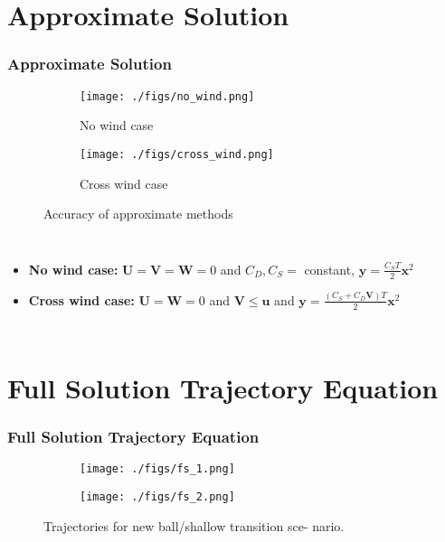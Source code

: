 \documentclass{beamer}
\renewcommand{\vec}[1]{\mathbf{#1}}
\begin{document}
\section{Approximate Solution}
\begin{frame}
\frametitle{Approximate Solution}

\begin{figure}[h!]
  \centering
  \begin{subfigure}[b]{0.4\linewidth}
    \texttt{[image: ./figs/no\_wind.png]}
    \caption{No wind case}
  \end{subfigure}
  \begin{subfigure}[b]{0.4\linewidth}
    \texttt{[image: ./figs/cross\_wind.png]}
    \caption{Cross wind case}
  \end{subfigure}
  \caption{Accuracy of approximate methods}
  \label{fig:Accuracy of approximate methods}
\end{figure}

\begin{columns}
  \begin{itemize}
  \item \textbf{No wind case:} $\vec{U}=\vec{V}=\vec{W}=0$ and $C_D, C_S =$ constant,
  $ \vec{y}=\frac{C_S T}{2} \vec{x}^2$
  \item \textbf{Cross wind case:} $\vec{U}=\vec{W}=0$ and $\vec{V}\leq\vec{u}$ and 
 $ \vec{y}=\frac{(C_S + C_D \vec{V}) T}{2} \vec{x}^2$
  
  \end{itemize}
\end{columns}
\end{frame}


\section{Full Solution Trajectory Equation}
\begin{frame} 
\frametitle{Full Solution Trajectory Equation}

\begin{figure}[h!]
  \centering
  \begin{subfigure}[b]{0.5\linewidth}
    \texttt{[image: ./figs/fs\_1.png]}
  \end{subfigure}
  \begin{subfigure}[b]{0.5\linewidth}
    \texttt{[image: ./figs/fs\_2.png]}
  \end{subfigure}
  \caption{Trajectories for new ball/shallow transition sce-
nario.}
  \label{fig:fs12}
\end{figure}
\end{frame}
\end{document}
